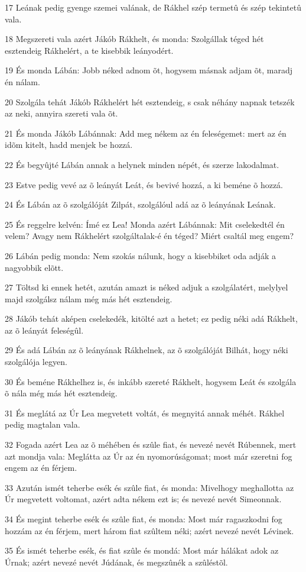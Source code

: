 \par 17 Leának pedig gyenge szemei valának, de Rákhel szép termetû és szép tekintetû vala.
\par 18 Megszereti vala azért Jákób Rákhelt, és monda: Szolgállak téged hét esztendeig Rákhelért, a te kisebbik leányodért.
\par 19 És monda Lábán: Jobb néked adnom õt, hogysem másnak adjam õt, maradj én nálam.
\par 20 Szolgála tehát Jákób Rákhelért hét esztendeig, s csak néhány napnak tetszék az neki, annyira szereti vala õt.
\par 21 És monda Jákób Lábánnak: Add meg nékem az én feleségemet: mert az én idõm kitelt, hadd menjek be hozzá.
\par 22 És begyûjté Lábán annak a helynek minden népét, és szerze lakodalmat.
\par 23 Estve pedig vevé az õ leányát Leát, és bevivé hozzá, a ki beméne õ hozzá.
\par 24 És Lábán az õ szolgálóját Zilpát, szolgálóul adá az õ leányának Leának.
\par 25 És reggelre kelvén: Ímé ez Lea! Monda azért Lábánnak: Mit cselekedtél én velem? Avagy nem Rákhelért szolgáltalak-é én téged? Miért csaltál meg engem?
\par 26 Lábán pedig monda: Nem szokás nálunk, hogy a kisebbiket oda adják a nagyobbik elõtt.
\par 27 Töltsd ki ennek hetét, azután amazt is néked adjuk a szolgálatért, melylyel majd szolgálsz nálam még más hét esztendeig.
\par 28 Jákób tehát aképen cselekedék, kitölté azt a hetet; ez pedig néki adá Rákhelt, az õ leányát feleségûl.
\par 29 És adá Lábán az õ leányának Rákhelnek, az õ szolgálóját Bilhát, hogy néki szolgálója legyen.
\par 30 És beméne Rákhelhez is, és inkább szereté Rákhelt, hogysem Leát és szolgála õ nála még más hét esztendeig.
\par 31 És meglátá az Úr Lea megvetett voltát, és megnyitá annak méhét. Rákhel pedig magtalan vala.
\par 32 Fogada azért Lea az õ méhében és szûle fiat, és nevezé nevét Rúbennek, mert azt mondja vala: Meglátta az Úr az én nyomorúságomat; most már szeretni fog engem az én férjem.
\par 33 Azután ismét teherbe esék és szûle fiat, és monda: Mivelhogy meghallotta az Úr megvetett voltomat, azért adta nékem ezt is; és nevezé nevét Simeonnak.
\par 34 És megint teherbe esék és szûle fiat, és monda: Most már ragaszkodni fog hozzám az én férjem, mert három fiat szûltem néki; azért nevezé nevét Lévinek.
\par 35 És ismét teherbe esék, és fiat szûle és mondá: Most már hálákat adok az Úrnak; azért nevezé nevét Júdának, és megszûnék a szûléstõl.

